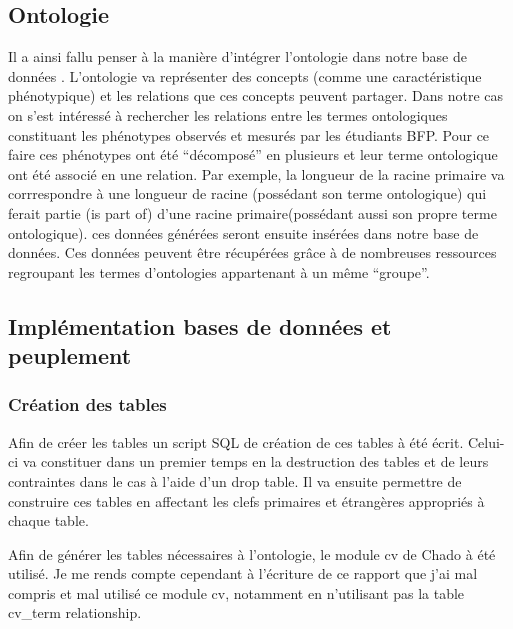 \documentclass[11pt,french,]{article}
\begin{document}
\hypertarget{ontologie}{%
\subsection{Ontologie}\label{ontologie}}

Il a ainsi fallu penser à la manière d'intégrer l'ontologie dans notre
base de données . L'ontologie va représenter des concepts (comme une
caractéristique phénotypique) et les relations que ces concepts peuvent
partager. Dans notre cas on s'est intéressé à rechercher les relations
entre les termes ontologiques constituant les phénotypes observés et
mesurés par les étudiants BFP. Pour ce faire ces phénotypes ont été
``décomposé'' en plusieurs et leur terme ontologique ont été associé en
une relation. Par exemple, la longueur de la racine primaire va
corrrespondre à une longueur de racine (possédant son terme ontologique)
qui ferait partie (is part of) d'une racine primaire(possédant aussi son
propre terme ontologique). ces données générées seront ensuite insérées
dans notre base de données. Ces données peuvent être récupérées grâce à
de nombreuses ressources regroupant les termes d'ontologies appartenant
à un même ``groupe''.

\hypertarget{implementation-bases-de-donnees-et-peuplement}{%
\subsection{Implémentation bases de données et
peuplement}\label{implementation-bases-de-donnees-et-peuplement}}

\hypertarget{creation-des-tables}{%
\subsubsection{Création des tables}\label{creation-des-tables}}

Afin de créer les tables un script SQL de création de ces tables à été
écrit. Celui-ci va constituer dans un premier temps en la destruction
des tables et de leurs contraintes dans le cas à l'aide d'un drop table.
Il va ensuite permettre de construire ces tables en affectant les clefs
primaires et étrangères appropriés à chaque table.

Afin de générer les tables nécessaires à l'ontologie, le module cv de
Chado à été utilisé. Je me rends compte cependant à l'écriture de ce
rapport que j'ai mal compris et mal utilisé ce module cv, notamment en
n'utilisant pas la table cv\_term relationship.
\end{document}
